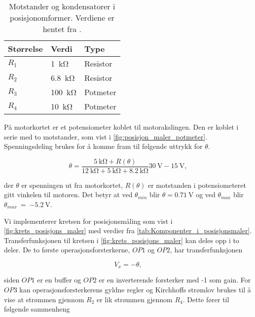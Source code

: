 \begin{table}[h!]
    \centering
    \caption{Motstander og kondensatorer i posisjonomformer. Verdiene er hentet fra \cite{AnalogMotorlabbOppgaver}.}
    \begin{tabular}{lll}
        \toprule
        Størrelse & Verdi & Type \\
		\midrule
        $R_1$ & \SI{1}{\kilo\ohm} & Resistor\\
        $R_2$ & \SI{6.8}{\kilo\ohm} & Resistor \\
        $R_3$ & \SI{100}{\kilo\ohm} & Potmeter \\
        $R_4$ & \SI{10}{\kilo\ohm} & Potmeter \\
        \bottomrule
    \end{tabular}
    \label{tab:Komponenter_i_posisjonsmaler}
\end{table}

På motorkortet er et potensiometer koblet til motorakslingen. Den er koblet i serie med to motstander, som vist i \autoref{fig:posisjon_maler_potmeter}. Spenningsdeling brukes for å komme fram til følgende uttrykk for $\theta$.

\begin{equation}
    \label{eq:V_av_theta}
    \theta = \frac{\SI{5}{\kilo\ohm} + R(\theta)}{\SI{12}{\kilo\ohm} + \SI{5}{\kilo\ohm} + \SI{8.2}{\kilo\ohm}} \SI{30}{\volt} - \SI{15}{\volt},
\end{equation}

der $\theta$ er spenningen ut fra motorkortet, $R(\theta)$ er motstanden i potensiometeret gitt vinkelen til motoren. Det betyr at ved $\theta_{min}$ blir $\theta = \SI{0.71}{\volt}$ og ved $\theta_{max}$ blir $\theta_{max}~=~\SI{-5.2}{\volt}$.

Vi implementerer kretsen for posisjonsmåling som vist i \autoref{fig:krets_posisjons_maler} med verdier fra \autoref{tab:Komponenter_i_posisjonsmaler}.
Transferfunksjonen til kretsen i \autoref{fig:krets_posisjons_maler} kan deles opp i to deler. De to første operasjonsforsterkerne, $OP1$ og $OP2$, har transferfunksjonen

\begin{equation}
    \label{eq:posisjon_maler_deltransferfunksjon}
    V_x = -\theta,
\end{equation}

siden $OP1$ er en buffer og $OP2$ er en inverterende forsterker med -1 som gain.
For $OP3$ kan operasjonsforsterkerens gyldne regler og Kirchhoffs strømlov brukes til å vise at strømmen gjennom $R_2$ er lik strømmen gjennom $R_4$. Dette fører til følgende sammenheng

